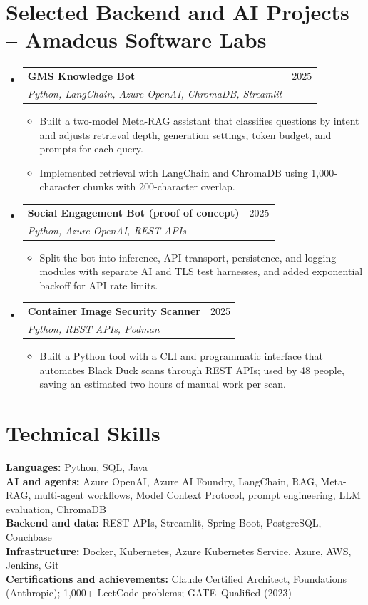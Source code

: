 \documentclass[a4paper,11pt]{article}
\makeatletter
\newcommand{\entry}[4]{\item\begin{tabularx}{\textwidth}{@{}Xr@{}}\textbf{#1}& #2\\\textit{\small #3}&\textit{\small #4}\end{tabularx}\vspace{-5pt}}
\newcommand{\bulletpoint}[1]{\item\small{#1}}
\makeatother
\begin{document}
\section{Selected Backend and AI Projects -- Amadeus Software Labs}
\begin{itemize}[leftmargin=0in,label={}]
  \entry{GMS Knowledge Bot}{2025}{Python, LangChain, Azure OpenAI, ChromaDB, Streamlit}{}
  \begin{itemize}
    \bulletpoint{Built a two-model Meta-RAG assistant that classif{}ies questions by intent and adjusts retrieval depth, generation settings, token budget, and prompts for each query.}
    \bulletpoint{Implemented retrieval with LangChain and ChromaDB using 1,000-character chunks with 200-character overlap.}
  \end{itemize}
  \entry{Social Engagement Bot (proof of concept)}{2025}{Python, Azure OpenAI, REST APIs}{}
  \begin{itemize}
    \bulletpoint{Split the bot into inference, API transport, persistence, and logging modules with separate AI and TLS test harnesses, and added exponential backof{}f for API rate limits.}
  \end{itemize}
  \entry{Container Image Security Scanner}{2025}{Python, REST APIs, Podman}{}
  \begin{itemize}
    \bulletpoint{Built a Python tool with a CLI and programmatic interface that automates Black Duck scans through REST APIs; used by 48 people, saving an estimated two hours of manual work per scan.}
  \end{itemize}
\end{itemize}

\section{Technical Skills}
\small\textbf{Languages:} Python, SQL, Java \\
\textbf{AI and agents:} Azure OpenAI, Azure AI Foundry, LangChain, RAG, Meta-RAG, multi-agent \mbox{workf{}lows}, Model Context Protocol, prompt engineering, LLM evaluation, ChromaDB \\
\textbf{Backend and data:} REST APIs, Streamlit, Spring Boot, PostgreSQL, Couchbase \\
\textbf{Infrastructure:} Docker, Kubernetes, Azure Kubernetes Service, Azure, AWS, Jenkins, Git \\
\textbf{Certif{}ications and achievements:} Claude \mbox{Certif{}ied} Architect, Foundations (Anthropic); 1,000+ LeetCode problems; \mbox{GATE Qualif{}ied} (2023)
\end{document}
